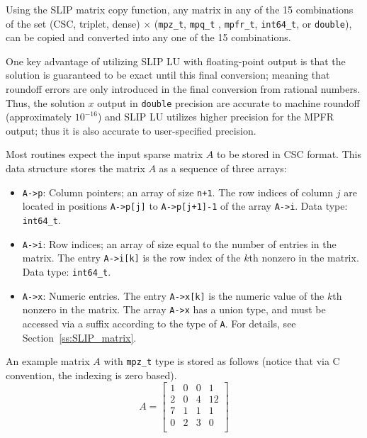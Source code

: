 \documentclass[12pt]{article}
\theoremstyle{definition}
\begin{document}
Using the SLIP matrix copy function, any matrix in any of the 15 combinations
of the set (CSC, triplet, dense) $\times$ (\verb|mpz_t|, \verb|mpq_t| ,
\verb|mpfr_t|, \verb|int64_t|, or \verb|double|), can be copied and converted
into any one of the 15 combinations.

One key advantage of utilizing SLIP LU with floating-point output is that the
solution is guaranteed to be exact until this final conversion; meaning that
roundoff errors are only introduced in the final conversion from rational
numbers. Thus, the solution $x$ output in \verb|double| precision are accurate
to machine roundoff (approximately $10^{-16}$) and SLIP LU utilizes higher
precision for the MPFR output; thus it is also accurate to user-specified
precision.

Most routines expect the input sparse matrix $A$ to be stored in CSC format.
This data structure stores the matrix $A$ as a sequence of three arrays:

\begin{itemize}
\item
\verb|A->p|: Column pointers; an array of size \verb|n+1|. The row indices of
column $j$ are located in positions \verb|A->p[j]| to \verb|A->p[j+1]-1| of the
array \verb|A->i|. Data type: \verb|int64_t|.

\item
\verb|A->i|: Row indices; an array of size equal to the number of entries in
the matrix. The entry \verb|A->i[k]| is the row index of the $k$th nonzero in
the matrix. Data type: \verb|int64_t|.

\item
\verb|A->x|: Numeric entries. The entry \verb|A->x[k]| is the numeric value of
the $k$th nonzero in the matrix.  The array \verb|A->x| has a union type, and
must be accessed via a suffix according to the type of \verb|A|.  For details,
see Section~\ref{ss:SLIP_matrix}.

\end{itemize}

An example matrix $A$ with \verb|mpz_t| type is stored as follows (notice that
via C convention, the indexing is zero based).
\[
A = \begin{bmatrix}
1 & 0 & 0 & 1 \\
2 & 0 & 4 & 12 \\
7 & 1 & 1 & 1 \\
0 & 2 & 3 & 0 \\
\end{bmatrix}
\]
\end{document}
